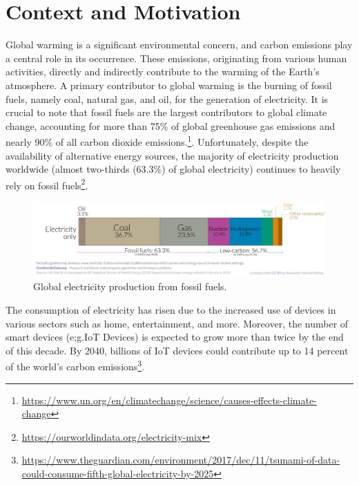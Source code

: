 \section{Context and Motivation}
Global warming is a significant environmental concern, and carbon emissions play a central role in its occurrence. These emissions, originating from various human activities, directly and indirectly contribute to the warming of the Earth's atmosphere. A primary contributor to global warming is the burning of fossil fuels, namely coal, natural gas, and oil, for the generation of electricity. It is crucial to note that fossil fuels are the largest contributors to global climate change, accounting for more than 75\% of global greenhouse gas emissions and nearly 90\% of all carbon dioxide emissions.\footnote{\url{https://www.un.org/en/climatechange/science/causes-effects-climate-change}}. Unfortunately, despite the availability of alternative energy sources, the majority of electricity production worldwide (almost two-thirds (63.3\%) of global electricity) continues to heavily rely on fossil fuels\footnote{\url{https://ourworldindata.org/electricity-mix}}.
\vspace{-12pt}
\begin{figure}[htbp]
  \centering
  \includegraphics[width=1\textwidth]{img/Global_electricity_from_fossil_fuels.jpg}
  \caption{Global electricity production from fossil fuels\protect\footnotemark.}
  \label{fig:Global_electricity_from_fossil_fuels}
\end{figure}
\vspace{-10pt}

The consumption of electricity has risen due to the increased use of devices in various sectors such as home, entertainment, and more. Moreover, the number of smart devices (e;g.IoT Devices) is expected to grow more than twice by the end of this decade. By 2040, billions of IoT devices could contribute up to 14 percent of the world’s carbon emissions\footnote{\url{https://www.theguardian.com/environment/2017/dec/11/tsunami-of-data-could-consume-fifth-global-electricity-by-2025}}.

